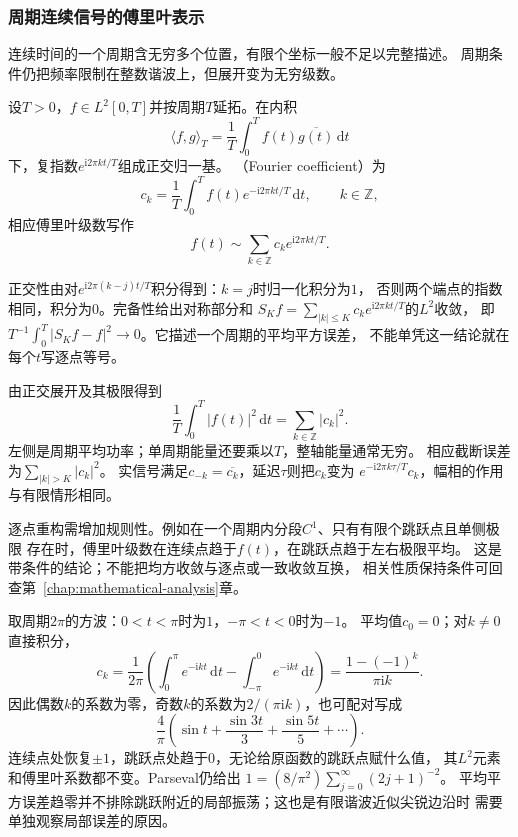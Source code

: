 \subsubsection{周期连续信号的傅里叶表示}

连续时间的一个周期含无穷多个位置，有限个坐标一般不足以完整描述。
周期条件仍把频率限制在整数谐波上，但展开变为无穷级数。
\begin{definition}[周期信号的傅里叶系数与级数]
  \label{def:signal-analysis-fourier-series}
  设$T>0$，$f\in L^2[0,T]$并按周期$T$延拓。在内积
  \[
    \langle f,g\rangle_T=\frac1T\int_0^T f(t)\overline{g(t)}\,\mathrm dt
  \]
  下，复指数$e^{\mathrm i2\pi kt/T}$组成正交归一基。
  （Fourier coefficient）为
  \[
    c_k=\frac1T\int_0^T f(t)e^{-\mathrm i2\pi kt/T}\,\mathrm dt,
    \qquad k\in\mathbb Z,
  \]
  相应傅里叶级数写作
  \begin{equation}
    f(t)\sim\sum_{k\in\mathbb Z}c_ke^{\mathrm i2\pi kt/T}.
    \label{eq:signal-analysis-fourier-series}
  \end{equation}
\end{definition}
正交性由对$e^{\mathrm i2\pi(k-j)t/T}$积分得到：$k=j$时归一化积分为$1$，
否则两个端点的指数相同，积分为$0$。完备性给出对称部分和
$S_Kf=\sum_{|k|\leq K}c_ke^{\mathrm i2\pi kt/T}$的$L^2$收敛，
即$T^{-1}\int_0^T|S_Kf-f|^2\to0$。它描述一个周期的平均平方误差，
不能单凭这一结论就在每个$t$写逐点等号。

由正交展开及其极限得到
\begin{equation}
  \frac1T\int_0^T|f(t)|^2\,\mathrm dt
  =\sum_{k\in\mathbb Z}|c_k|^2.
  \label{eq:signal-analysis-continuous-parseval}
\end{equation}
左侧是周期平均功率；单周期能量还要乘以$T$，整轴能量通常无穷。
相应截断误差为$\sum_{|k|>K}|c_k|^2$。
实信号满足$c_{-k}=\overline{c_k}$，延迟$\tau$则把$c_k$变为
$e^{-\mathrm i2\pi k\tau/T}c_k$，幅相的作用与有限情形相同。

逐点重构需增加规则性。例如在一个周期内分段$C^1$、只有有限个跳跃点且单侧极限
存在时，傅里叶级数在连续点趋于$f(t)$，在跳跃点趋于左右极限平均。
这是带条件的结论；不能把均方收敛与逐点或一致收敛互换，
相关性质保持条件可回查第~\ref{chap:mathematical-analysis}章。

取周期$2\pi$的方波：$0<t<\pi$时为$1$，$-\pi<t<0$时为$-1$。
平均值$c_0=0$；对$k\neq0$直接积分，
\[
  c_k=\frac1{2\pi}\left(
    \int_0^\pi e^{-\mathrm ikt}\,\mathrm dt
    -\int_{-\pi}^0 e^{-\mathrm ikt}\,\mathrm dt\right)
  =\frac{1-(-1)^k}{\pi\mathrm ik}.
\]
因此偶数$k$的系数为零，奇数$k$的系数为$2/(\pi\mathrm ik)$，也可配对写成
\[
  \frac4\pi\left(\sin t+\frac{\sin3t}{3}+\frac{\sin5t}{5}+\cdots\right).
\]
连续点处恢复$\pm1$，跳跃点处趋于$0$，无论给原函数的跳跃点赋什么值，
其$L^2$元素和傅里叶系数都不变。Parseval仍给出
$1=(8/\pi^2)\sum_{j=0}^{\infty}(2j+1)^{-2}$。
平均平方误差趋零并不排除跳跃附近的局部振荡；这也是有限谐波近似尖锐边沿时
需要单独观察局部误差的原因。

